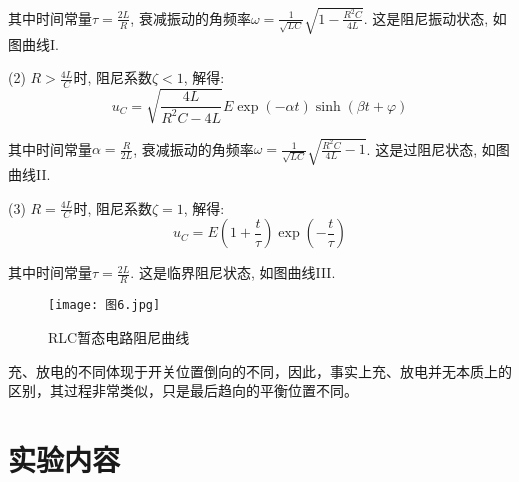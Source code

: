 \documentclass[11pt]{article}
\begin{document}
其中时间常量$\displaystyle \tau = \frac{2L}{R}$, 衰减振动的角频率$\displaystyle \omega = \frac{1}{\sqrt{LC}} \sqrt{1-\frac{R^2C}{4L}}$. 这是阻尼振动状态, 如图曲线I.


(2) $\displaystyle R>\frac{4L}{C}$时, 阻尼系数$\zeta < 1$, 解得:
\[
    u_C = \sqrt{\frac{4L}{R^2C - 4L}}E \exp\left( -\alpha t\right) \sinh(\beta t+\varphi)
\]

其中时间常量$\displaystyle \alpha = \frac{R}{2L}$, 衰减振动的角频率$\displaystyle \omega = \frac{1}{\sqrt{LC}} \sqrt{\frac{R^2C}{4L}-1}$. 这是过阻尼状态, 如图曲线II.



(3) $\displaystyle R=\frac{4L}{C}$时, 阻尼系数$\zeta = 1$, 解得:
\[
    u_C = E \left(1+\frac{t}{\tau}\right) \exp \left( -\frac{t}{\tau}\right)
\]

其中时间常量$\displaystyle \tau = \frac{2L}{R}$. 这是临界阻尼状态, 如图曲线III.

\begin{figure}[htb]
    \centering
    \texttt{[image: 图6.jpg]}
    \caption{RLC暂态电路阻尼曲线}
\end{figure}

充、放电的不同体现于开关位置倒向的不同，因此，事实上充、放电并无本质上的区别，其过程非常类似，只是最后趋向的平衡位置不同。

\section{实验内容}
\end{document}
